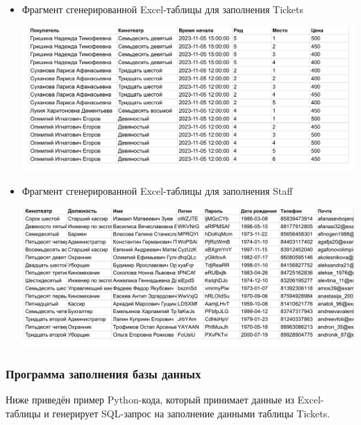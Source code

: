 \documentclass[a4paper,12pt]{article}
\renewcommand{\^}[2]{#1^{\, #2} \kern -1pt}
\newcommand{\1}{\kern 1pt}
\newcommand{\0}{\kern -1pt}
\begin{document}
\begin{itemize}
	
	\item Фрагмент сгенерированной Excel-таблицы для заполнения Tickets
	
	\includegraphics[scale=0.7,page=1]{tickets_random.pdf}
	
	
	\item Фрагмент сгенерированной Excel-таблицы для заполнения Staff
	
	\includegraphics[scale=0.7,page=1]{staff_random.pdf}
	
	\end{itemize}
	
	\newpage
	
	\subsubsection{Программа заполнения базы данных}
	
	Ниже приведён пример Python-кода, который принимает данные из Excel-таблицы и генерирует SQL-запрос на заполнение данными таблицы Tickets.
	
\end{document}
